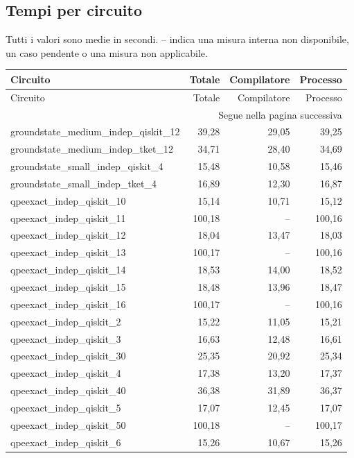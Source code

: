 \subsection{Tempi per circuito}
Tutti i valori sono medie in secondi. -- indica una misura interna non disponibile, un caso pendente o una misura non applicabile.
\begingroup\footnotesize
\setlength{\tabcolsep}{5pt}
\begin{longtable}{lrrr}
\toprule
Circuito & Totale & Compilatore & Processo \\
\midrule
\endfirsthead
\toprule
Circuito & Totale & Compilatore & Processo \\
\midrule\endhead
\midrule\multicolumn{4}{r}{\footnotesize Segue nella pagina successiva}\\
\endfoot
\bottomrule\endlastfoot
groundstate\_medium\_indep\_qiskit\_12 & 39,28 & 29,05 & 39,25 \\
groundstate\_medium\_indep\_tket\_12 & 34,71 & 28,40 & 34,69 \\
groundstate\_small\_indep\_qiskit\_4 & 15,48 & 10,58 & 15,46 \\
groundstate\_small\_indep\_tket\_4 & 16,89 & 12,30 & 16,87 \\
qpeexact\_indep\_qiskit\_10 & 15,14 & 10,71 & 15,12 \\
qpeexact\_indep\_qiskit\_11 & 100,18 & -- & 100,16 \\
qpeexact\_indep\_qiskit\_12 & 18,04 & 13,47 & 18,03 \\
qpeexact\_indep\_qiskit\_13 & 100,17 & -- & 100,16 \\
qpeexact\_indep\_qiskit\_14 & 18,53 & 14,00 & 18,52 \\
qpeexact\_indep\_qiskit\_15 & 18,48 & 13,96 & 18,47 \\
qpeexact\_indep\_qiskit\_16 & 100,17 & -- & 100,16 \\
qpeexact\_indep\_qiskit\_2 & 15,22 & 11,05 & 15,21 \\
qpeexact\_indep\_qiskit\_3 & 16,63 & 12,48 & 16,61 \\
qpeexact\_indep\_qiskit\_30 & 25,35 & 20,92 & 25,34 \\
qpeexact\_indep\_qiskit\_4 & 17,38 & 13,20 & 17,37 \\
qpeexact\_indep\_qiskit\_40 & 36,38 & 31,89 & 36,37 \\
qpeexact\_indep\_qiskit\_5 & 17,07 & 12,45 & 17,07 \\
qpeexact\_indep\_qiskit\_50 & 100,18 & -- & 100,17 \\
qpeexact\_indep\_qiskit\_6 & 15,26 & 10,67 & 15,26 \\

\end{longtable}
